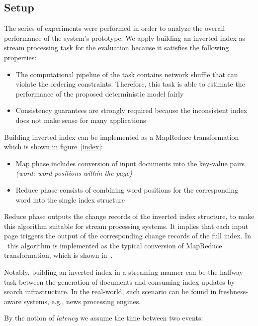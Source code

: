 
\label {fs-experiments-seciton}

\subsection{Setup}
The series of experiments were performed in order to analyze the overall performance of the system's prototype. We apply building an inverted index as stream processing task for the evaluation because it satisfies the following properties:

\begin{itemize}
    \item The computational pipeline of the task contains network shuffle that can violate the ordering constraints. Therefore, this task is able to estimate the performance of the proposed deterministic model fairly
    \item Consistency guarantees are strongly required because the inconsistent index does not make sense for many applications
\end{itemize}

Building inverted index can be implemented as a MapReduce transformation which is shown in figure~\ref{index}: 

\begin{itemize}
    \item Map phase includes conversion of input documents into the key-value pairs {\it (word; word positions within the page)}
    \item Reduce phase consists of combining word positions for the corresponding word into the single index structure 
\end{itemize}

Reduce phase outputs the change records of the inverted index structure, to make this algorithm suitable for stream processing systems. It implies that each input page triggers the output of the corresponding change records of the full index. In \FlameStream\ this algorithm is implemented as the typical conversion of MapReduce transformation, which is shown in~\cite{we2018seim}.

Notably, building an inverted index in a streaming manner can be the halfway task between the generation of documents and consuming index updates by search infrastructure. In the real-world, such scenario can be found in freshness-aware systems, e.g., news processing engines.

By the notion of {\it latency} we assume the time between two events: 

